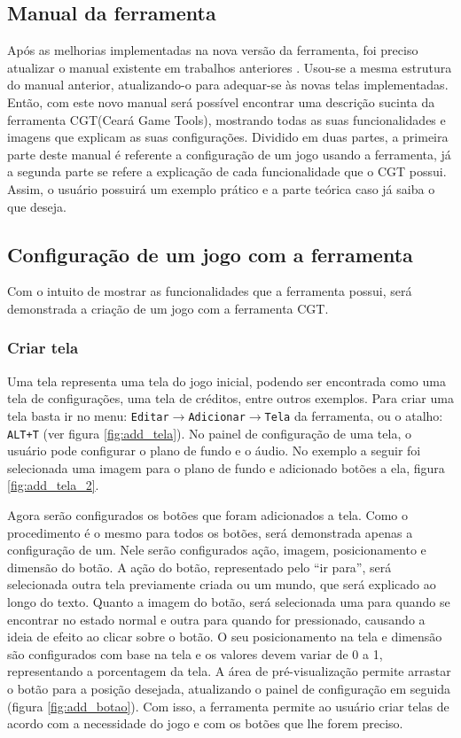 \documentclass[12pt,twoside,openright,a4paper,english,brazil,sumario=tradicional]{abntex2}
\begin{document}
\begin{anexosenv}
   \partanexos
   \chapter{Manual da ferramenta}

   Após as melhorias implementadas na nova versão da ferramenta, foi preciso atualizar o manual existente em trabalhos anteriores \cite{monografia:aquino}. Usou-se a mesma estrutura do manual anterior, atualizando-o para adequar-se às novas telas implementadas.
   Então, com este novo manual será possível encontrar uma descrição sucinta da ferramenta CGT(Ceará Game Tools), mostrando todas as suas funcionalidades e imagens que explicam as suas configurações.
   Dividido em duas partes, a primeira parte deste manual é referente a configuração de um jogo usando a ferramenta, já a segunda parte se refere a explicação de cada funcionalidade que o CGT possui.
   Assim, o usuário possuirá um exemplo prático e a parte teórica caso já saiba o que deseja.

   \section{Configuração de um jogo com a ferramenta}
   Com o intuito de mostrar as funcionalidades que a ferramenta possui, será demonstrada a criação de um jogo com a ferramenta CGT.

   \subsection{Criar tela}
   Uma tela representa uma tela do jogo inicial, podendo ser encontrada como uma tela de configurações, uma tela de créditos, entre outros exemplos.
   Para criar uma tela basta ir no menu: \texttt{Editar$\rightarrow$Adicionar$\rightarrow$Tela} da ferramenta, ou o atalho: \texttt{ALT+T} (ver figura \ref{fig:add_tela}).
   No painel de configuração de uma tela, o usuário pode configurar o plano de fundo e o áudio.
   No exemplo a seguir foi selecionada uma imagem para o plano de fundo e adicionado botões a ela, figura \ref{fig:add_tela_2}.

   Agora serão configurados os botões que foram adicionados a tela.
   Como o procedimento é o mesmo para todos os botões, será demonstrada apenas a configuração de um. Nele serão configurados ação, imagem, posicionamento e dimensão do botão.
   A ação do botão, representado pelo “ir para”, será selecionada outra tela previamente criada ou um mundo, que será explicado ao longo do texto.
   Quanto a imagem do botão, será selecionada uma para quando se encontrar no estado normal e outra para quando for pressionado, causando a ideia de efeito ao clicar sobre o botão.
   O seu posicionamento na tela e dimensão são configurados com base na tela e os valores devem variar de 0 a 1, representando a porcentagem da tela. A área de pré-visualização permite arrastar o botão para a posição desejada, atualizando o painel de configuração em seguida (figura \ref{fig:add_botao}).
   Com isso, a ferramenta permite ao usuário criar telas de acordo com a necessidade do jogo e com os botões que lhe forem preciso.


\end{anexosenv}
\end{document}
